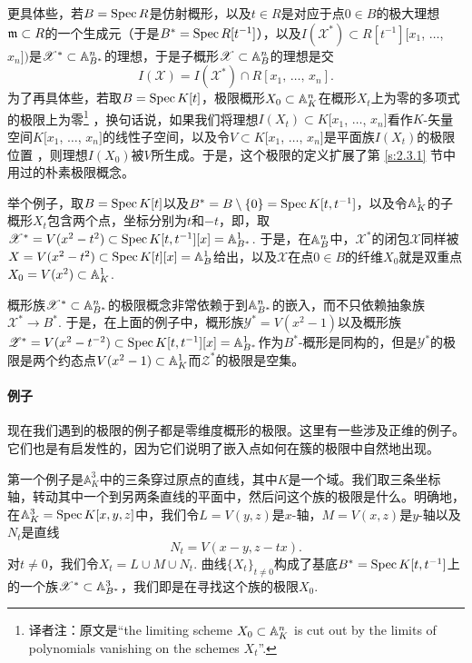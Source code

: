 更具体些，若$B=\operatorname{Spec} R$是仿射概形，以及$t\in R$是对应于点$0\in B$的极大理想$\mathfrak{m}\subset R$的一个生成元（于是$B^*=\operatorname{Spec} R[t^{-1}]$），以及$I(\mathscr{X}^*)\subset R[t^{-1}][x_1$, $\dots$, $x_n])$是$\mathscr{X}^*\subset \mathbb{A}_{B^*}^n$的理想，于是子概形$\mathscr{X}\subset \mathbb{A}_{B}^n$的理想是交
\[
	I(\mathscr{X})=I(\mathscr{X}^*)\cap R[x_1,\,\dots,\,x_n].
\]
为了再具体些，若取$B=\operatorname{Spec} K[t]$，极限概形$X_0\subset \mathbb{A}_K^n$在概形$X_t$上为零的多项式的极限上为零\footnote{译者注：原文是``the limiting scheme $X_0\subset \mathbb{A}_K^n$ is cut out by the limits of polynomials vanishing on the schemes $X_t$''.} ，换句话说，如果我们将理想$I(X_t)\subset K[x_1$, $\dots$, $x_n]$看作$K$\hyp 矢量空间$K[x_1$, $\dots$, $x_n]$的线性子空间，以及令$V\subset K[x_1$, $\dots$, $x_n]$是平面族$I(X_t)$的极限位置 ，则理想$I(X_0)$被$V$所生成。于是，这个极限的定义扩展了第 \ref{s:2.3.1} 节中用过的朴素极限概念。

举个例子，取$B=\operatorname{Spec} K[t]$以及$B^*=B\setminus \{0\}=\operatorname{Spec} K[t,t^{-1}]$，以及令$\mathbb{A}_K^1$的子概形$X_t$包含两个点，坐标分别为$t$和$-t$，即，取$\mathscr{X}^*=V(x^2-t^2)\subset \operatorname{Spec} K[t,t^{-1}][x]=\mathbb{A}_{B^*}^1$. 于是，在$\mathbb{A}_B^n$中，$\mathscr{X}^*$的闭包$\mathscr{X}$同样被$X=V(x^2-t^2)\subset \operatorname{Spec} K[t][x]=\mathbb{A}_B^1$给出，以及$\mathscr{X}$在点$0\in B$的纤维$X_0$就是双重点$X_0=V(x^2)\subset\mathbb{A}_K^1$.

概形族$\mathscr{X}^*\subset \mathbb{A}_{B^*}^n$的极限概念非常依赖于到$\mathbb{A}_{B^*}^n$的嵌入，而不只依赖抽象族$\mathscr{X}^*\to B^*$. 于是，在上面的例子中，概形族$\mathscr{Y}^*=V(x^2-1)$以及概形族$\mathscr{Z}^*=V(x^2-t^{-2})\subset \operatorname{Spec} K[t,t^{-1}][x]=\mathbb{A}_{B^*}^1$作为$B^*$\hyp 概形是同构的，但是$\mathscr{Y}^*$的极限是两个约态点$V(x^2-1)\subset \mathbb{A}^1_K$而$\mathscr{Z}^*$的极限是空集。

\paragraph*{例子}
现在我们遇到的极限的例子都是零维度概形的极限。这里有一些涉及正维的例子。 它们也是有启发性的，因为它们说明了嵌入点如何在簇的极限中自然地出现。

第一个例子是$\mathbb{A}_K^3$中的三条穿过原点的直线，其中$K$是一个域。我们取三条坐标轴，转动其中一个到另两条直线的平面中，然后问这个族的极限是什么。明确地，在$\mathbb{A}_K^3=\operatorname{Spec} K[x,y,z]$中，我们令$L=V(y,z)$是$x$-轴，$M=V(x,z)$是$y$-轴以及$N_t$是直线
\[
	N_t=V(x-y,z-tx).
\]
对$t\neq 0$，我们令$X_t=L\cup M\cup N_t$. 曲线$\{X_t\}_{t\neq 0}$构成了基底$B^*=\operatorname{Spec} K[t,t^{-1}]$上的一个族$\mathscr{X}^*\subset \mathbb{A}_{B^*}^3$，我们即是在寻找这个族的极限$X_0$.

